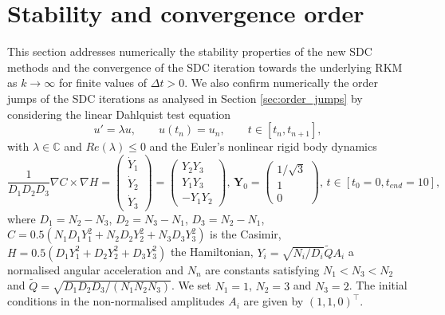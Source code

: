 \documentclass[sn-mathphys-num]{sn-jnl}%
\theoremstyle{thmstyleone}%
\theoremstyle{thmstyletwo}%
\theoremstyle{thmstylethree}%
\begin{document}
\section{Stability and convergence order}\label{sec:numexp}

This section addresses numerically the stability properties of the new SDC methods and the convergence of the SDC iteration towards the underlying RKM as $k \to \infty$ for finite values of  $\Delta t > 0$.
We also confirm numerically the order jumps of the SDC iterations as analysed in Section \ref{sec:order_jumps} by considering the linear Dahlquist test equation
\begin{equation}
	u' = \lambda u, \qquad u(t_n) = u_n, \qquad t \in [t_n, t_{n+1}],
	\label{Dahlquist}
\end{equation}
with $\lambda \in \mathbb{C}$ and $Re(\lambda) \leq 0$ and the Euler's nonlinear rigid body dynamics~\citep{Vilmart2015}
\begin{equation}
	\label{eq:euler}
	\frac{1}{D_1 D_2 D_3} \nabla C \times \nabla H = \begin{pmatrix}
	\dot{Y}_1 \\
	\dot{Y}_2 \\
	\dot{Y}_3
	\end{pmatrix} = \begin{pmatrix}
	Y_2Y_3 \\
	Y_1Y_3 \\
	-Y_1Y_2
	\end{pmatrix}, \, \bm{Y}_0 = \begin{pmatrix}1/\sqrt{3} \\ 1 \\0 \end{pmatrix}, \, t \in [t_0 = 0, t_{end} = 10],
\end{equation}
where $D_1 = N_2 - N_3$, $D_2 = N_3 - N_1$, $D_3 = N_2 - N_1$, $C = 0.5(N_1D_1Y_1^2 + N_2D_2 Y_2^2 + N_3D_3Y_3^2)$ is the Casimir, $H = 0.5(D_1 Y_1^2 + D_2 Y_2^2 + D_3 Y_3^2)$ the Hamiltonian, $Y_i = \sqrt{N_i/D_i}\tilde{Q} A_i$ a normalised angular acceleration and $N_n$ are constants satisfying $N_1 < N_3 < N_2$ and $\tilde{Q}= \sqrt{D_1D_2D_3/(N_1N_2N_3)}$. 
We set $N_1 = 1$, $N_2 = 3$ and $N_3 = 2$. 
The initial conditions in the non-normalised amplitudes $A_i$ are given by $(1,1,0)^\intercal$.

\end{document}
